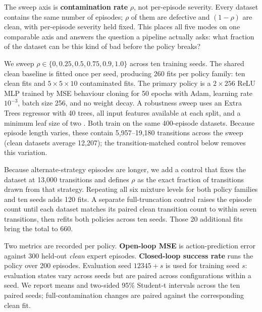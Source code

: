 \documentclass[10pt,twocolumn]{article}
\begin{document}
The sweep axis is \textbf{contamination rate} $\rho$, not per-episode
severity. Every dataset contains the same number of episodes; $\rho$ of them
are defective and $(1-\rho)$ are clean, with per-episode severity held fixed.
This places all five modes on one comparable axis and answers the question a
pipeline actually asks: what fraction of the dataset can be this kind of bad
before the policy breaks?

We sweep $\rho \in \{0, 0.25, 0.5, 0.75, 0.9, 1.0\}$ across ten training
seeds. The shared clean baseline is fitted once per seed, producing 260 fits
per policy family: ten clean fits and $5\times5\times10$ contaminated fits.
The primary policy is a $2\times256$ ReLU MLP trained by MSE behaviour cloning
for 50 epochs with Adam, learning rate $10^{-3}$, batch size 256, and no
weight decay. A robustness sweep uses an Extra Trees regressor with 40 trees,
all input features available at each split, and a minimum leaf size of two
\cite{geurts2006extratrees}. Both train on the same 400-episode datasets.
Because episode length varies, these contain 5,957--19,180 transitions across
the sweep (clean datasets average 12,207); the transition-matched control below
removes this variation.

Because alternate-strategy episodes are longer, we add a control that fixes
the dataset at 13,000 transitions and defines $\rho$ as the exact fraction of
transitions drawn from that strategy. Repeating all six mixture levels for
both policy families and ten seeds adds 120 fits. A separate full-truncation
control raises the episode count until each dataset matches its paired clean
transition count to within seven transitions, then refits both policies across
ten seeds. Those 20 additional fits bring the total to 660.

Two metrics are recorded per policy. \textbf{Open-loop MSE} is
action-prediction error against 300 held-out \emph{clean} expert episodes.
\textbf{Closed-loop success rate} runs the policy over 200 episodes. Evaluation
seed $12345+s$ is used for training seed $s$: evaluation states vary across
seeds but are paired across configurations within a seed. We report means and
two-sided 95\% Student-t intervals across the ten paired seeds;
full-contamination changes are paired against the corresponding clean fit.
\end{document}
